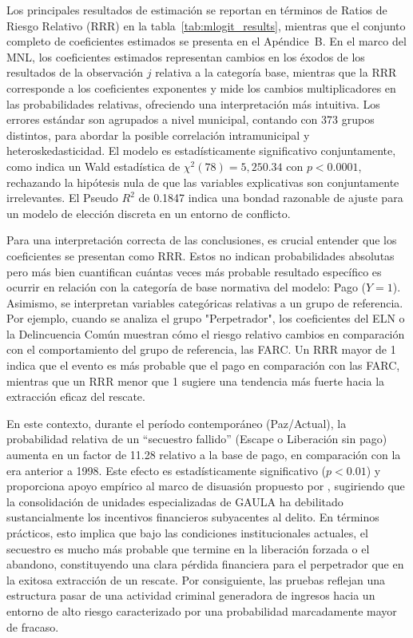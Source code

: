 \documentclass[12pt]{article}
\providecommand{\textcite}{\citet}
\theoremstyle{definition}
\theoremstyle{remark}
\newcommand{\1}{\mathbf{1}}
\begin{document}
Los principales resultados de estimación se reportan en términos de Ratios de Riesgo Relativo (RRR) en la tabla~\ref{tab:mlogit_results}, mientras que el conjunto completo de coeficientes estimados se presenta en el Apéndice~B. En el marco del MNL, los coeficientes estimados representan cambios en los éxodos de los resultados de la observación $j$ relativa a la categoría base, mientras que la RRR corresponde a los coeficientes exponentes y mide los cambios multiplicadores en las probabilidades relativas, ofreciendo una interpretación más intuitiva. Los errores estándar son agrupados a nivel municipal, contando con 373 grupos distintos, para abordar la posible correlación intramunicipal y heteroskedasticidad. El modelo es estadísticamente significativo conjuntamente, como indica un Wald estadística de $\chi^2(78) = 5{,}250.34$ con $p < 0.0001$, rechazando la hipótesis nula de que las variables explicativas son conjuntamente irrelevantes. El Pseudo $R^2$ de 0.1847 indica una bondad razonable de ajuste para un modelo de elección discreta en un entorno de conflicto.


Para una interpretación correcta de las conclusiones, es crucial entender que los coeficientes se presentan como RRR. Estos no indican probabilidades absolutas pero más bien cuantifican cuántas veces más probable resultado específico es ocurrir en relación con la categoría de base normativa del modelo: Pago ($Y=1$). Asimismo, se interpretan variables categóricas relativas a un grupo de referencia. Por ejemplo, cuando se analiza el grupo "Perpetrador", los coeficientes del ELN o la Delincuencia Común muestran cómo el riesgo relativo cambios en comparación con el comportamiento del grupo de referencia, las FARC. Un RRR mayor de 1 indica que el evento es más probable que el pago en comparación con las FARC, mientras que un RRR menor que 1 sugiere una tendencia más fuerte hacia la extracción eficaz del rescate.

En este contexto, durante el período contemporáneo (Paz/Actual), la probabilidad relativa de un “secuestro fallido” (Escape o Liberación sin pago) aumenta en un factor de 11.28 relativo a la base de pago, en comparación con la era anterior a 1998. Este efecto es estadísticamente significativo ($p<0.01$) y proporciona apoyo empírico al marco de disuasión propuesto por \textcite{Mejia2000Secuestro}, sugiriendo que la consolidación de unidades especializadas de GAULA ha debilitado sustancialmente los incentivos financieros subyacentes al delito. En términos prácticos, esto implica que bajo las condiciones institucionales actuales, el secuestro es mucho más probable que termine en la liberación forzada o el abandono, constituyendo una clara pérdida financiera para el perpetrador que en la exitosa extracción de un rescate. Por consiguiente, las pruebas reflejan una estructura pasar de una actividad criminal generadora de ingresos hacia un entorno de alto riesgo caracterizado por una probabilidad marcadamente mayor de fracaso.
\end{document}
